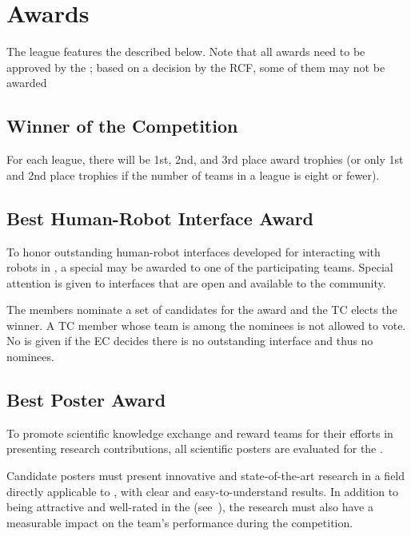 \section{Awards}\label{sec:awards}

The \AtHome{} league features the  described below.
Note that all awards need to be approved by the \RCF{}; based on a decision by the RCF, some of them may not be awarded

\subsection{Winner of the Competition}\label{award:winner}

For each league, there will be 1st, 2nd, and 3rd place award trophies (or only 1st and 2nd place trophies if the number of teams in a league is eight or fewer).

\subsection{Best Human-Robot Interface Award}\label{award:hri}

To honor outstanding human-robot interfaces developed for interacting with robots in \AtHome{}, a special \HRIAward{} may be awarded to one of the participating teams.
Special attention is given to interfaces that are open and available to the \AtHome{} community.

The \AtHome{} \EC{} members nominate a set of candidates for the award and the TC elects the winner.
A TC member whose team is among the nominees is not allowed to vote.
No \HRIAward{} is given if the EC decides there is no outstanding interface and thus no nominees.

\subsection{Best Poster Award}\label{award:poster}

To promote scientific knowledge exchange and reward teams for their efforts in presenting research contributions, all scientific posters are evaluated for the \OPLPosterAward{}.

Candidate posters must present innovative and state-of-the-art research in a field directly applicable to \AtHome{}, with clear and easy-to-understand results.
In addition to being attractive and well-rated in the \PS{} (see~), the research must also have a measurable impact on the team's performance during the competition.

